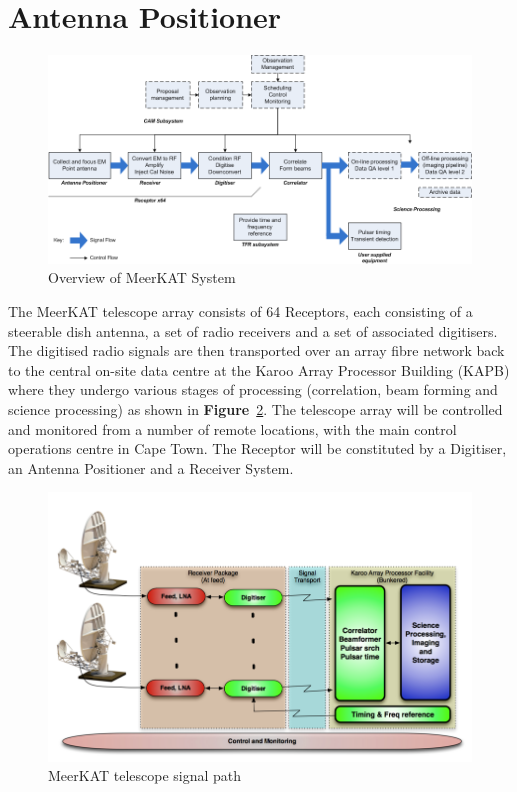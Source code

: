 \section{Antenna Positioner} 
\begin{figure}[!thb]
	\centering
	\includegraphics[scale=0.5]{Chapters/images/image49.png}
	
	\caption{Overview of MeerKAT System}
	\label{fig:image49}
\end{figure}
The MeerKAT telescope array consists of 64 Receptors, each consisting of a steerable dish antenna, a set of radio receivers and a set of associated digitisers. The digitised radio signals are then transported over an array fibre network back to the central on-site data centre at the Karoo Array Processor Building (KAPB) where they undergo various stages of processing (correlation, beam forming and science processing) as shown in \textbf{Figure}~\ref{fig:image64}. The telescope array will be controlled and monitored from a number of remote locations, with the main control operations centre in Cape Town. The Receptor will be constituted by a Digitiser, an Antenna Positioner and a Receiver System.
\begin{figure}[H]
	\centering
	\includegraphics[scale=0.5]{Chapters/images/image64.png}
	
	\caption{MeerKAT telescope signal path}
	\label{fig:image64}
\end{figure}
